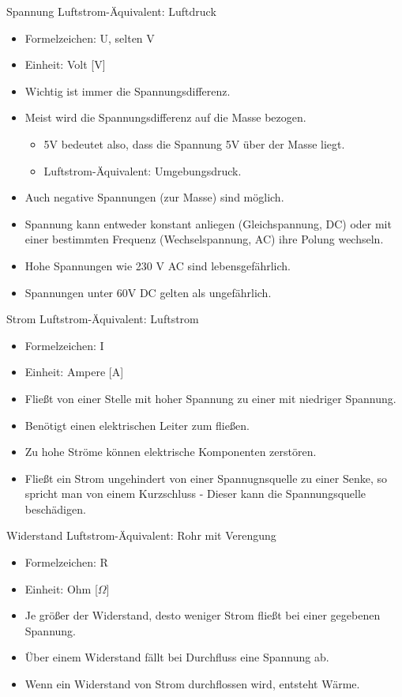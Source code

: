 \documentclass[12pt]{beamer}
\begin{document}
\begin{frame}{Spannung}
Luftstrom-Äquivalent: Luftdruck
\begin{itemize}
\item Formelzeichen: U, selten V
\item Einheit: Volt [V]
\item Wichtig ist immer die Spannungsdifferenz.
\item Meist wird die Spannungsdifferenz auf die Masse bezogen.
\begin{itemize} %
  \item 5V bedeutet also, dass die Spannung 5V über der Masse liegt.
  \item Luftstrom-Äquivalent: Umgebungsdruck.
\end{itemize}
\item Auch negative Spannungen (zur Masse) sind möglich.
\item Spannung kann entweder konstant anliegen (Gleichspannung, DC) oder mit einer bestimmten Frequenz (Wechselspannung, AC) ihre Polung wechseln.
\item Hohe Spannungen wie 230 V AC sind lebensgefährlich.
\item Spannungen unter 60V DC gelten als ungefährlich.
\end{itemize}
\end{frame}

\begin{frame}{Strom}
Luftstrom-Äquivalent: Luftstrom
\begin{itemize}
\item Formelzeichen: I
\item Einheit: Ampere [A]
\item Fließt von einer Stelle mit hoher Spannung zu einer mit niedriger Spannung.
\item Benötigt einen elektrischen Leiter zum fließen.
\item Zu hohe Ströme können elektrische Komponenten zerstören.
\item Fließt ein Strom ungehindert von einer Spannugnsquelle zu einer Senke, so spricht man von einem Kurzschluss - Dieser kann die Spannungsquelle beschädigen.
\end{itemize}
\end{frame}

\begin{frame}{Widerstand}
Luftstrom-Äquivalent: Rohr mit Verengung
\begin{itemize}
\item Formelzeichen: R
\item Einheit: Ohm [$\Omega$]
\item Je größer der Widerstand, desto weniger Strom fließt bei einer gegebenen Spannung.
\item Über einem Widerstand fällt bei Durchfluss eine Spannung ab.
\item Wenn ein Widerstand von Strom durchflossen wird, entsteht Wärme.
\end{itemize}
\end{frame}
\end{document}
